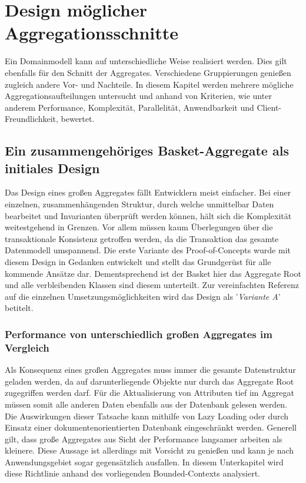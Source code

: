\chapter{Design möglicher Aggregationsschnitte }

Ein Domainmodell kann auf unterschiedliche Weise realisiert werden. Dies gilt ebenfalls für den Schnitt der Aggregates. Verschiedene Gruppierungen genießen zugleich andere Vor- und Nachteile. In diesem Kapitel werden mehrere mögliche Aggregationsaufteilungen untersucht und anhand von Kriterien, wie unter anderem Performance, Komplexität, Parallelität, Anwendbarkeit und Client-Freundlichkeit, bewertet.

\section{Ein zusammengehöriges Basket-Aggregate als initiales Design}

Das Design eines großen Aggregates fällt Entwicklern meist einfacher. Bei einer einzelnen, zusammenhängenden Struktur, durch welche unmittelbar Daten bearbeitet und Invarianten überprüft werden können, hält sich die Komplexität weitestgehend in Grenzen. Vor allem müssen kaum Überlegungen über die transaktionale Konsistenz getroffen werden, da die Transaktion das gesamte Datenmodell umspannend. Die erste Variante des Proof-of-Concepts wurde mit diesem Design in Gedanken entwickelt und stellt das Grundgerüst für alle kommende Ansätze dar. Dementsprechend ist der Basket hier das Aggregate Root und alle verbleibenden Klassen sind diesem unterteilt. Zur vereinfachten Referenz auf die einzelnen Umsetzungsmöglichkeiten wird das Design als '\emph{Variante A}' betitelt.


\subsection{Performance von unterschiedlich großen Aggregates im Vergleich}

Als Konsequenz eines großen Aggregates muss immer die gesamte Datenstruktur geladen werden, da auf darunterliegende Objekte nur durch das Aggregate Root zugegriffen werden darf. Für die Aktualisierung von Attributen tief im Aggregat müssen somit alle anderen Daten ebenfalls aus der Datenbank gelesen werden. Die Auswirkungen dieser Tatsache kann mithilfe von \gls{Lazy Loading} oder durch Einsatz einer dokumentenorientierten Datenbank eingeschränkt werden. Generell gilt, dass große Aggregates aus Sicht der Performance langsamer arbeiten als kleinere. Diese Aussage ist allerdings mit Vorsicht zu genießen und kann je nach Anwendungsgebiet sogar gegensätzlich ausfallen. In diesem Unterkapitel wird diese Richtlinie anhand des vorliegenden Bounded-Contexts analysiert.

